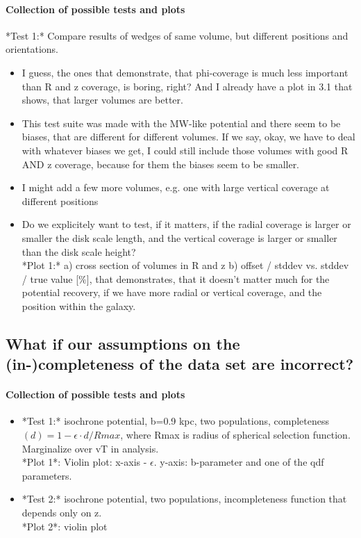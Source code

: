 \documentclass[12pt,preprint]{aastex}
\begin{document}
\paragraph{Collection of possible tests and plots}

 *Test 1:* Compare results of wedges of same volume, but different positions and orientations. 
 \begin{itemize}
    \item I guess, the ones that demonstrate, that phi-coverage is much less important than R and z coverage, is boring, right? And I already have a plot in 3.1 that shows, that larger volumes are better. 
    \item This test suite was made with the MW-like potential and there seem to be biases, that are different for different volumes. If we say, okay, we have to deal with whatever biases we get, I could still include those volumes with good R AND z coverage, because for them the biases seem to be smaller.
    \item I might add a few more volumes, e.g. one with large vertical coverage at different positions
    \item Do we explicitely want to test, if it matters, if the radial coverage is larger or smaller the disk scale length, and the vertical coverage is larger or smaller than the disk scale height?\\
*Plot 1:* 
    a) cross section of volumes in R and z
    b) offset / stddev vs. stddev / true value [\%], that demonstrates, that it doesn't matter much for the potential recovery, if we have more radial or vertical coverage, and the position within the galaxy. 
     \end{itemize}
     
\subsection{What if our assumptions on the (in-)completeness of the data set are incorrect?}

\paragraph{Collection of possible tests and plots}

\begin{itemize}
\item  *Test 1:* isochrone potential, b=0.9 kpc, two populations, completeness$(d) = 1 - \epsilon \cdot d/Rmax$, where Rmax is radius of spherical selection function. Marginalize over vT in analysis. \\
*Plot 1*: Violin plot: x-axis - $\epsilon$. y-axis: b-parameter and one of the qdf parameters.
\item  *Test 2:* isochrone potential, two populations, incompleteness function that depends only on z. \\
*Plot 2*: violin plot
\end{itemize}
\end{document}
